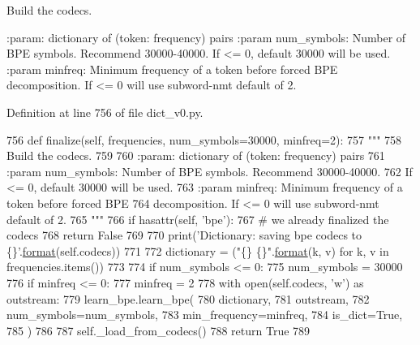 \begin{DoxyVerb}Build the codecs.

:param: dictionary of (token: frequency) pairs
:param num_symbols: Number of BPE symbols. Recommend 30000-40000.
    If <= 0, default 30000 will be used.
:param minfreq: Minimum frequency of a token before forced BPE
    decomposition. If <= 0 will use subword-nmt default of 2.
\end{DoxyVerb}
 

Definition at line 756 of file dict\+\_\+v0.\+py.


\begin{DoxyCode}
756     \textcolor{keyword}{def }finalize(self, frequencies, num\_symbols=30000, minfreq=2):
757         \textcolor{stringliteral}{"""}
758 \textcolor{stringliteral}{        Build the codecs.}
759 \textcolor{stringliteral}{}
760 \textcolor{stringliteral}{        :param: dictionary of (token: frequency) pairs}
761 \textcolor{stringliteral}{        :param num\_symbols: Number of BPE symbols. Recommend 30000-40000.}
762 \textcolor{stringliteral}{            If <= 0, default 30000 will be used.}
763 \textcolor{stringliteral}{        :param minfreq: Minimum frequency of a token before forced BPE}
764 \textcolor{stringliteral}{            decomposition. If <= 0 will use subword-nmt default of 2.}
765 \textcolor{stringliteral}{        """}
766         \textcolor{keywordflow}{if} hasattr(self, \textcolor{stringliteral}{'bpe'}):
767             \textcolor{comment}{# we already finalized the codecs}
768             \textcolor{keywordflow}{return} \textcolor{keyword}{False}
769 
770         print(\textcolor{stringliteral}{'Dictionary: saving bpe codecs to \{\}'}.\hyperlink{namespaceparlai_1_1chat__service_1_1services_1_1messenger_1_1shared__utils_a32e2e2022b824fbaf80c747160b52a76}{format}(self.codecs))
771 
772         dictionary = (\textcolor{stringliteral}{"\{\} \{\}"}.\hyperlink{namespaceparlai_1_1chat__service_1_1services_1_1messenger_1_1shared__utils_a32e2e2022b824fbaf80c747160b52a76}{format}(k, v) \textcolor{keywordflow}{for} k, v \textcolor{keywordflow}{in} frequencies.items())
773 
774         \textcolor{keywordflow}{if} num\_symbols <= 0:
775             num\_symbols = 30000
776         \textcolor{keywordflow}{if} minfreq <= 0:
777             minfreq = 2
778         with open(self.codecs, \textcolor{stringliteral}{'w'}) \textcolor{keyword}{as} outstream:
779             learn\_bpe.learn\_bpe(
780                 dictionary,
781                 outstream,
782                 num\_symbols=num\_symbols,
783                 min\_frequency=minfreq,
784                 is\_dict=\textcolor{keyword}{True},
785             )
786 
787         self.\_load\_from\_codecs()
788         \textcolor{keywordflow}{return} \textcolor{keyword}{True}
789 \end{DoxyCode}
